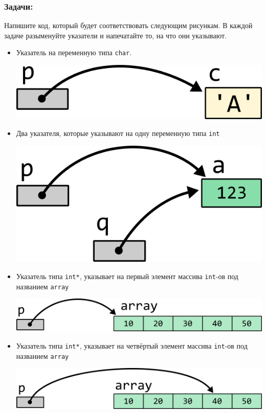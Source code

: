 \documentclass{article}
\begin{document}
\subsubsection*{Задачи:}
Напишите код, который будет соответствовать следующим рисункам. В каждой задаче разыменуйте указатели и напечатайте то, на что они указывают.
\begin{itemize}
\item Указатель на переменную типа \texttt{char}.
\begin{center}
\includegraphics[scale=1]{../images/pointer_tasks/pointer_task_char.png}
\end{center}

\item Два указателя, которые указывают на одну переменную типа \texttt{int}
\begin{center}
\includegraphics[scale=1]{../images/pointer_tasks/pointer_tasks_two_int.png}
\end{center}

\item Указатель типа \texttt{int*}, указывает на первый элемент массива \texttt{int}-ов под названием \texttt{array}
\begin{center}
\includegraphics[scale=1]{../images/pointer_tasks/pointer_task_array.png}
\end{center}

\item Указатель типа \texttt{int*}, указывает на четвёртый элемент массива \texttt{int}-ов под названием \texttt{array}
\begin{center}
\includegraphics[scale=1]{../images/pointer_tasks/pointer_task_array_4.png}
\end{center}



\end{itemize}
\end{document}
